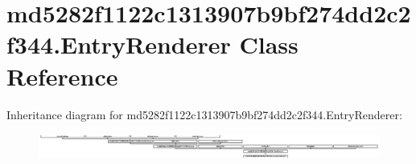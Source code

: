 \hypertarget{classmd5282f1122c1313907b9bf274dd2c2f344_1_1EntryRenderer}{}\section{md5282f1122c1313907b9bf274dd2c2f344.\+Entry\+Renderer Class Reference}
\label{classmd5282f1122c1313907b9bf274dd2c2f344_1_1EntryRenderer}
Inheritance diagram for md5282f1122c1313907b9bf274dd2c2f344.\+Entry\+Renderer\+:\begin{figure}[H]
\begin{center}
\leavevmode
\includegraphics[height=0.857843cm]{classmd5282f1122c1313907b9bf274dd2c2f344_1_1EntryRenderer}
\end{center}
\end{figure}
